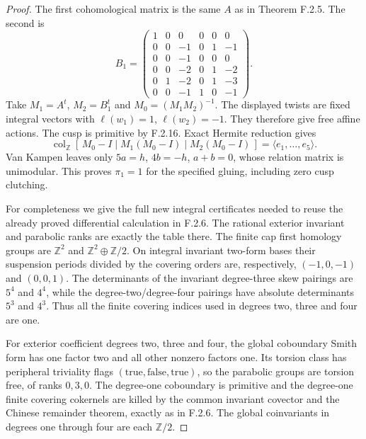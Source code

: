 \begin{proof}
The first cohomological matrix is the same $A$ as in
Theorem F.2.5.  The second is
\[
 B_1=\begin{pmatrix}
 1&0&0&0&0&0\\
 0&0&-1&0&1&-1\\
 0&0&-1&0&0&0\\
 0&0&-2&0&1&-2\\
 0&1&-2&0&1&-3\\
 0&0&-1&1&0&-1
 \end{pmatrix}.
 \tag{F.U11}
\]
Take $M_1=A^t$, $M_2=B_1^t$ and
$M_0=(M_1M_2)^{-1}$.  The displayed twists are fixed integral
vectors with $\ell(w_1)=1$, $\ell(w_2)=-1$.
They therefore give free affine actions.  The cusp is
primitive by F.2.16.  Exact Hermite reduction gives
\[
 \operatorname{col}_{\mathbb Z}
 [\,M_0-I\mid M_1(M_0-I)\mid M_2(M_0-I)\,]
       =\langle e_1,\ldots,e_5\rangle.
\]
Van Kampen leaves only $5a=h$, $4b=-h$, $a+b=0$,
whose relation matrix is unimodular.  This proves
$\pi_1=1$ for the specified gluing, including zero cusp
clutching.

For completeness we give the full new integral certificates
needed to reuse the already proved differential calculation
in F.2.6.  The rational exterior invariant and parabolic ranks
are exactly the table there.  The finite cap first homology
groups are $\mathbb Z^2$ and $\mathbb Z^2\oplus\mathbb Z/2$.
On integral invariant two-form bases their suspension periods
divided by the covering orders are, respectively,
$(-1,0,-1)$ and $(0,0,1)$.  The determinants of the invariant
degree-three skew pairings are $5^4$ and $4^4$, while the
degree-two/degree-four pairings have absolute determinants
$5^3$ and $4^3$.  Thus all the finite covering indices used
in degrees two, three and four are one.

For exterior coefficient degrees two, three and four, the
global coboundary Smith form has one factor two and all other
nonzero factors one.  Its torsion class has peripheral
triviality flags $(\mathrm{true},\mathrm{false},\mathrm{true})$,
so the parabolic groups are torsion free, of ranks $0,3,0$.
The degree-one coboundary is primitive and the degree-one
finite covering cokernels are killed by the common invariant
covector and the Chinese remainder theorem, exactly as in
F.2.6.  The global coinvariants in degrees one through four
are each $\mathbb Z/2$.


\end{proof}
